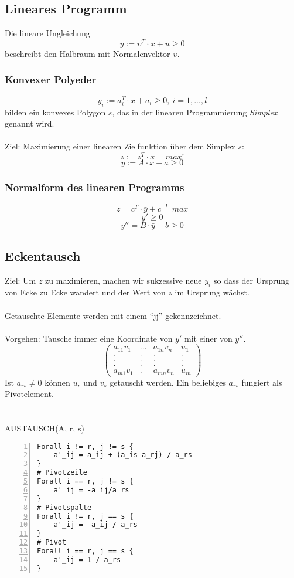 \subsection{Lineares Programm}
Die lineare Ungleichung
\[y := \upsilon^T \cdot x + u \geq 0\]
beschreibt den Halbraum mit Normalenvektor \(\upsilon\).

\subsubsection{Konvexer Polyeder}
\[y_i := a_i^T \cdot x + a_i \geq 0,~i = 1,...,l\]
bilden ein konvexes Polygon \(s\), das in der linearen Programmierung \textit{Simplex} genannt wird.
\\\\
Ziel: Maximierung einer linearen Zielfunktion über dem Simplex \(s\):
\[z := z^T \cdot x = max!\]
\[y := A\cdot x + a \geq 0\]

\subsubsection{Normalform des linearen Programms}
\[z = c^T\cdot \bar{y} + c \stackrel{!}{=} max\]
\[y' \geq 0\]
\[y'' = B \cdot \bar{y} + b \geq 0\]


\subsection{Eckentausch}
Ziel: Um \(z\) zu maximieren, machen wir sukzessive neue \(y_i\) so dass der Ursprung von Ecke zu Ecke wandert und der Wert von \(z\) im Ursprung wächst.
\\\\
Getauschte Elemente werden mit einem "`jj"' gekennzeichnet.
\\\\
Vorgehen: Tausche immer eine Koordinate von \(y'\) mit einer von \(y''\).
\[\begin{pmatrix}
	a_{11}v_1 & ... &a_{1n}v_n & u_1\\
	.   &		.	& .   & . \\
	.   &		.	& .   & . \\
	.   &		.	& .   & . \\
	a_{m1}v_1 & . & a_{mn}v_n & u_m
\end{pmatrix}\]
Ist \(a_{rs} \ne 0\) können \(u_r\) und \(v_s\) getauscht werden. Ein beliebiges \(a_{rs}\) fungiert als Pivotelement. 
\\\\\\
AUSTAUSCH(A, r, s)
\begin{lstlisting}[frame=single,numbers=left]
Forall i != r, j != s {
	a'_ij = a_ij + (a_is a_rj) / a_rs
}
# Pivotzeile
Forall i == r, j != s {
	a'_ij = -a_ij/a_rs
}
# Pivotspalte
Forall i != r, j == s {
	a'_ij = -a_ij / a_rs
}
# Pivot
Forall i == r, j == s {
	a'_ij = 1 / a_rs
}
\end{lstlisting}


